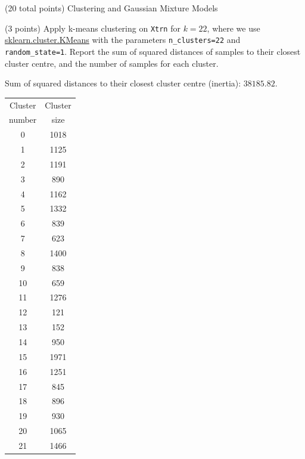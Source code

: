 \documentclass[12pt]{article}
\begin{document}
\begin{question}{(20 total points) Clustering and Gaussian Mixture Models}  


  


  \medskip
   \begin{subquestion}{(3 points)
       Apply k-means clustering on {\tt Xtrn} for $k = 22$, where we use
       \href{https://scikit-learn.org/0.19/modules/generated/sklearn.cluster.KMeans.html}{sklearn.cluster.KMeans}
       with the parameters {\tt n\_clusters=22} and {\tt random\_state=1}.
       Report the sum of squared distances of samples to their closest
       cluster centre, and the number of samples for each cluster.
     } \label{Q3.1}
   

      \begin{answerbox}{35em}
         Sum of squared distances to their closest cluster centre (inertia): $38185.82$.
\begin{center}
\begin{tabular}{|c|c|}
\hline 
Cluster & Cluster \\
number & size \\\hline
0 & 1018 \\\hline
1 & 1125 \\\hline
2 & 1191 \\\hline
3 & 890 \\\hline
4 & 1162 \\\hline
5 & 1332 \\\hline
6 & 839 \\\hline
7 & 623 \\\hline
8 & 1400 \\\hline
9 & 838 \\\hline
10 & 659 \\\hline
11 & 1276 \\\hline
12 & 121 \\\hline
13 & 152 \\\hline
14 & 950 \\\hline
15 & 1971 \\\hline
16 & 1251 \\\hline
17 & 845 \\\hline
18 & 896 \\\hline
19 & 930 \\\hline
20 & 1065 \\\hline
21 & 1466 \\\hline


\end{tabular}
\end{center}
\end{answerbox}
\end{subquestion}
\end{question}
\end{document}
